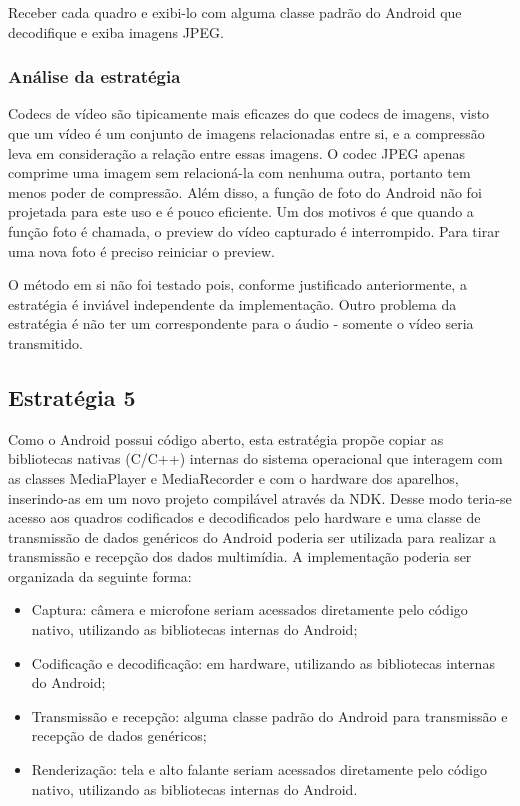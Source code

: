 \documentclass{acm_proc_article-sp}
\begin{document}
Receber cada quadro e exibi-lo com alguma classe padrão do Android que decodifique e exiba imagens JPEG.

\subsubsection{Análise da estratégia}

Codecs de vídeo são tipicamente mais eficazes do que codecs de imagens, visto que um vídeo é um conjunto de imagens relacionadas entre si, e a compressão leva em consideração a relação entre essas imagens. O codec JPEG apenas comprime uma imagem sem relacioná-la com nenhuma outra, portanto tem menos poder de compressão. Além disso, a função de foto do Android não foi projetada para este uso e é pouco eficiente. Um dos motivos é que quando a função foto é chamada, o preview do vídeo capturado é interrompido. Para tirar uma nova foto é preciso reiniciar o preview.

O método em si não foi testado pois, conforme justificado anteriormente, a estratégia é inviável independente da implementação. Outro problema da estratégia é não ter um correspondente para o áudio - somente o vídeo seria transmitido.

\subsection{Estratégia 5}
Como o Android possui código aberto, esta estratégia propõe copiar as bibliotecas nativas (C/C++) internas do sistema operacional que interagem com as classes MediaPlayer e MediaRecorder e com o hardware dos aparelhos, inserindo-as em um novo projeto compilável através da NDK. Desse modo teria-se acesso aos quadros codificados e decodificados pelo hardware e uma classe de transmissão de dados genéricos do Android poderia ser utilizada para realizar a transmissão e recepção dos dados multimídia. A implementação poderia ser organizada da seguinte forma:

\begin{itemize}
 \item Captura: câmera e microfone seriam acessados diretamente pelo código nativo, utilizando as bibliotecas internas do Android;
 \item Codificação e decodificação: em hardware, utilizando as bibliotecas internas do Android;
 \item Transmissão e recepção: alguma classe padrão do Android para transmissão e recepção de dados genéricos;
 \item Renderização: tela e alto falante seriam acessados diretamente pelo código nativo, utilizando as bibliotecas internas do Android.
\end{itemize}
 
\end{document}
